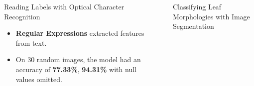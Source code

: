 \documentclass[final]{beamer}
\newlength{\sepwidth}
\newlength{\colwidth}
\newcommand{\separatorcolumn}{\begin{column}{\sepwidth}\end{column}}
\begin{document}
\begin{frame}[t]
\begin{columns}[t]
\begin{column}{\colwidth}
\begin{block}{Reading Labels with Optical Character Recognition}
\begin{itemize}
    \parpic(0px, 0px)(0px, 1.7cm)[r]{
    }
    \item \textbf{Regular Expressions} extracted features from text.
    \item On 30 random images, the model had an accuracy of \textbf{77.33\%}, \textbf{94.31\%} with null values omitted.
\end{itemize}



\end{block}

\end{column}

\separatorcolumn

\begin{column}{\colwidth}

\begin{block}{Classifying Leaf Morphologies with Image Segmentation}



\end{block}
\end{column}
\end{columns}
\end{frame}
\end{document}
